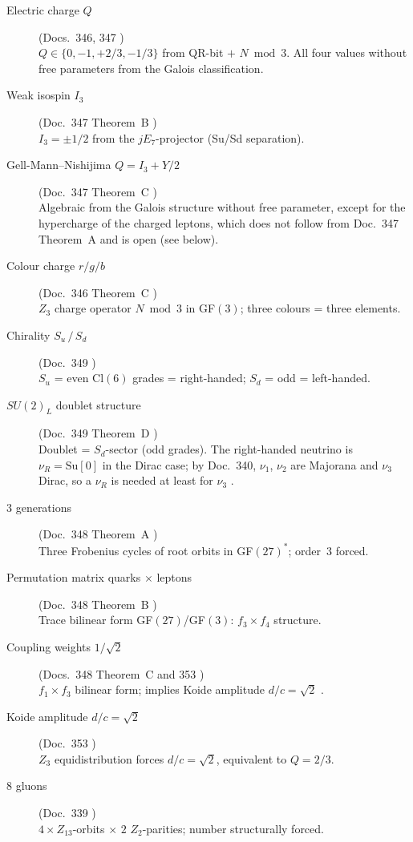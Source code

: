 \begin{description}

\item[Electric charge $Q$] (Docs.~346, 347 \BM)\\
$Q\in\{0,-1,+2/3,-1/3\}$ from QR-bit $+$ $N\bmod3$.
All four values without free parameters from the Galois classification.

\item[Weak isospin $I_3$] (Doc.~347 Theorem~B \BM)\\
$I_3 = \pm 1/2$ from the $jE_7$-projector (Su/Sd separation).

\item[Gell-Mann--Nishijima $Q = I_3 + Y/2$] (Doc.~347 Theorem~C \BM)\\
Algebraic from the Galois structure without free parameter, except for
the hypercharge of the charged leptons, which does not follow from
Doc.~347 Theorem~A and is open (see below).

\item[Colour charge $r/g/b$] (Doc.~346 Theorem~C \BM)\\
$Z_3$ charge operator $N\bmod3$ in GF$(3)$; three colours = three elements.

\item[Chirality $S_u\,/\,S_d$] (Doc.~349 \BM)\\
$S_u$ = even Cl$(6)$ grades = right-handed;
$S_d$ = odd = left-handed.

\item[$SU(2)_L$ doublet structure] (Doc.~349 Theorem~D \BM)\\
Doublet = $S_d$-sector (odd grades). The right-handed neutrino is
$\nu_R = \mathrm{Su}[0]$ in the Dirac case; by Doc.~340, $\nu_1$, $\nu_2$ are
Majorana and $\nu_3$ Dirac, so a $\nu_R$ is needed at least for $\nu_3$ \SM.

\item[3 generations] (Doc.~348 Theorem~A \BM)\\
Three Frobenius cycles of root orbits in GF$(27)^*$; order~3 forced.

\item[Permutation matrix quarks $\times$ leptons] (Doc.~348 Theorem~B \BM)\\
Trace bilinear form GF$(27)$/GF$(3)$: $f_3\times f_4$ structure.

\item[Coupling weights $1/\sqrt{2}$] (Docs.~348 Theorem~C and 353 \BM)\\
$f_1\times f_3$ bilinear form; implies Koide amplitude $d/c=\sqrt{2}$ \BM.

\item[Koide amplitude $d/c=\sqrt{2}$] (Doc.~353 \BM)\\
$Z_3$ equidistribution forces $d/c=\sqrt{2}$, equivalent to $Q=2/3$.

\item[8 gluons] (Doc.~339 \BM)\\
$4\times Z_{13}$-orbits $\times$ $2$ $Z_2$-parities; number structurally forced.

\end{description}


